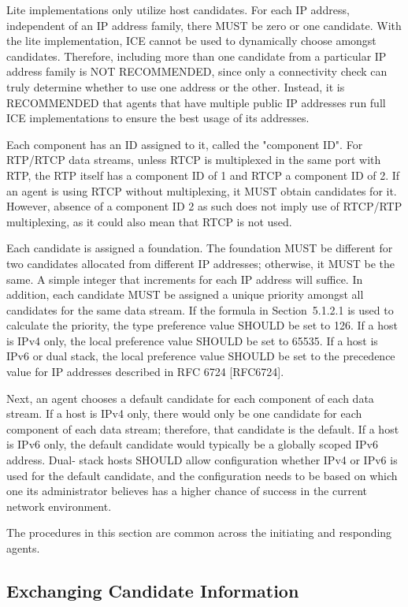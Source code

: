 \documentclass{article}
\begin{document}
Lite implementations only utilize host candidates.  For each IP address, independent of an IP address family, there MUST be zero or one candidate.  With the lite implementation, ICE cannot be used to dynamically choose amongst candidates.  Therefore, including more than one candidate from a particular IP address family is NOT RECOMMENDED, since only a connectivity check can truly determine whether to use one address or the other.  Instead, it is RECOMMENDED that agents that have multiple public IP addresses run full ICE implementations to ensure the best usage of its addresses.

Each component has an ID assigned to it, called the "component ID". For RTP/RTCP data streams, unless RTCP is multiplexed in the same port with RTP, the RTP itself has a component ID of 1 and RTCP a component ID of 2.  If an agent is using RTCP without multiplexing, it MUST obtain candidates for it.  However, absence of a component ID 2 as such does not imply use of RTCP/RTP multiplexing, as it could also mean that RTCP is not used.

Each candidate is assigned a foundation.  The foundation MUST be different for two candidates allocated from different IP addresses; otherwise, it MUST be the same.  A simple integer that increments for each IP address will suffice.  In addition, each candidate MUST be assigned a unique priority amongst all candidates for the same data stream.  If the formula in Section~5.1.2.1 is used to calculate the priority, the type preference value SHOULD be set to 126.  If a host is IPv4 only, the local preference value SHOULD be set to 65535.  If a host is IPv6 or dual stack, the local preference value SHOULD be set to the precedence value for IP addresses described in RFC 6724 [RFC6724].

Next, an agent chooses a default candidate for each component of each data stream.  If a host is IPv4 only, there would only be one candidate for each component of each data stream; therefore, that candidate is the default.  If a host is IPv6 only, the default candidate would typically be a globally scoped IPv6 address.  Dual- stack hosts SHOULD allow configuration whether IPv4 or IPv6 is used for the default candidate, and the configuration needs to be based on which one its administrator believes has a higher chance of success in the current network environment.

The procedures in this section are common across the initiating and responding agents.

\subsection{Exchanging Candidate Information}
\end{document}
